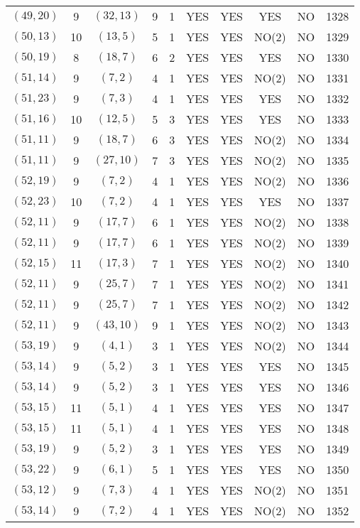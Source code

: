 \begin{longtable}{|c|c|c|c|c|c|c|c|c|c|}
$(49, 20)$ & 9 & $(32, 13)$ & 9 & 1 & YES & YES & YES & NO & 1328\\
$(50, 13)$ & 10 & $(13, 5)$ & 5 & 1 & YES & YES & NO(2) & NO & 1329\\
$(50, 19)$ & 8 & $(18, 7)$ & 6 & 2 & YES & YES & YES & NO & 1330\\
$(51, 14)$ & 9 & $(7, 2)$ & 4 & 1 & YES & YES & NO(2) & NO & 1331\\
$(51, 23)$ & 9 & $(7, 3)$ & 4 & 1 & YES & YES & YES & NO & 1332\\
$(51, 16)$ & 10 & $(12, 5)$ & 5 & 3 & YES & YES & YES & NO & 1333\\
$(51, 11)$ & 9 & $(18, 7)$ & 6 & 3 & YES & YES & NO(2) & NO & 1334\\
$(51, 11)$ & 9 & $(27, 10)$ & 7 & 3 & YES & YES & NO(2) & NO & 1335\\
$(52, 19)$ & 9 & $(7, 2)$ & 4 & 1 & YES & YES & NO(2) & NO & 1336\\
$(52, 23)$ & 10 & $(7, 2)$ & 4 & 1 & YES & YES & YES & NO & 1337\\
$(52, 11)$ & 9 & $(17, 7)$ & 6 & 1 & YES & YES & NO(2) & NO & 1338\\
$(52, 11)$ & 9 & $(17, 7)$ & 6 & 1 & YES & YES & NO(2) & NO & 1339\\
$(52, 15)$ & 11 & $(17, 3)$ & 7 & 1 & YES & YES & NO(2) & NO & 1340\\
$(52, 11)$ & 9 & $(25, 7)$ & 7 & 1 & YES & YES & NO(2) & NO & 1341\\
$(52, 11)$ & 9 & $(25, 7)$ & 7 & 1 & YES & YES & NO(2) & NO & 1342\\
$(52, 11)$ & 9 & $(43, 10)$ & 9 & 1 & YES & YES & NO(2) & NO & 1343\\
$(53, 19)$ & 9 & $(4, 1)$ & 3 & 1 & YES & YES & NO(2) & NO & 1344\\
$(53, 14)$ & 9 & $(5, 2)$ & 3 & 1 & YES & YES & YES & NO & 1345\\
$(53, 14)$ & 9 & $(5, 2)$ & 3 & 1 & YES & YES & YES & NO & 1346\\
$(53, 15)$ & 11 & $(5, 1)$ & 4 & 1 & YES & YES & YES & NO & 1347\\
$(53, 15)$ & 11 & $(5, 1)$ & 4 & 1 & YES & YES & YES & NO & 1348\\
$(53, 19)$ & 9 & $(5, 2)$ & 3 & 1 & YES & YES & YES & NO & 1349\\
$(53, 22)$ & 9 & $(6, 1)$ & 5 & 1 & YES & YES & YES & NO & 1350\\
$(53, 12)$ & 9 & $(7, 3)$ & 4 & 1 & YES & YES & NO(2) & NO & 1351\\
$(53, 14)$ & 9 & $(7, 2)$ & 4 & 1 & YES & YES & NO(2) & NO & 1352\\

\end{longtable}
